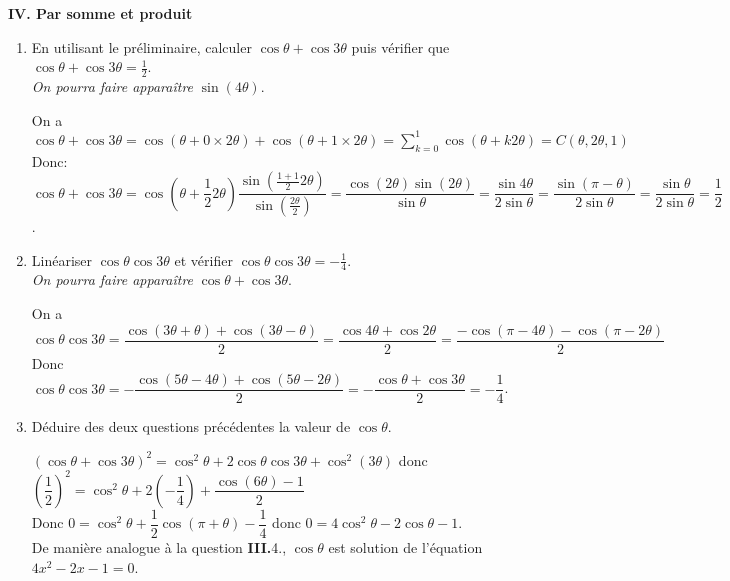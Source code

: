 \documentclass[a4paper,french,bookmarks]{article}
\begin{document}
\noindent\textbf{IV. Par somme et produit}
\begin{enumerate}
    \item En utilisant le préliminaire, calculer $\cos \theta + \cos 3\theta$ puis vérifier que $\cos \theta + \cos 3\theta = \frac{1}{2}$.\\
    \textit{On pourra faire apparaître} $\sin(4\theta)$.
        \begin{tcolorbox}[colback=black!8,colframe=black!9,boxrule=.25pt,enhanced,arc is angular,arc=0pt]
    On a $\displaystyle \cos \theta + \cos 3\theta = \cos(\theta + 0\times2\theta) + \cos(\theta + 1\times2\theta)
        = \sum_{k=0}^1 \cos(\theta + k2\theta) = C(\theta,2\theta,1)$ Donc:\\
        $\cos \theta + \cos 3\theta = \cos\left(\theta + \dfrac{1}{2}2\theta\right)\dfrac{\sin\left(\frac{1+1}{2}2\theta\right)}{\sin\left(\frac{2\theta}{2}\right)} = \dfrac{\cos(2\theta)\sin(2\theta)}{\sin \theta} = \dfrac{\sin 4\theta}{2\sin\theta} = \dfrac{\sin (\pi - \theta)}{2\sin \theta}=\dfrac{\sin\theta}{2\sin\theta}=\dfrac{1}{2}$.
    \end{tcolorbox}
    \item Linéariser $\cos \theta \cos 3\theta$ et vérifier $\cos \theta \cos 3\theta=-\frac{1}{4}$.\\
    \textit{On pourra faire apparaître} $\cos \theta + \cos 3\theta$.
         \begin{tcolorbox}[colback=black!8,colframe=black!9,boxrule=.25pt,enhanced,arc is angular,arc=0pt]
     On a $\displaystyle \cos\theta\cos3\theta = \dfrac{\cos(3\theta + \theta)+\cos(3\theta - \theta)}{2} = \dfrac{\cos 4\theta + \cos2\theta}{2} = \dfrac{-\cos(\pi-4\theta)-\cos(\pi-2\theta)}{2}$\\
     Donc $\cos\theta\cos3\theta = -\dfrac{\cos(5\theta - 4\theta) + \cos(5\theta - 2\theta)}{2} =-\dfrac{\cos\theta + \cos3\theta}{2} = -\dfrac{1}{4}$.
     \end{tcolorbox}
    \item Déduire des deux questions précédentes la valeur de $\cos \theta$.
    \begin{tcolorbox}[colback=black!8,colframe=black!9,boxrule=.25pt,enhanced,arc is angular,arc=0pt]
    $\left(\cos\theta + \cos3\theta\right)^2 = \cos^2\theta + 2\cos\theta\cos3\theta + \cos^2(3\theta)$ donc $\left(\dfrac{1}{2}\right)^2 = \cos^2\theta + 2\left(-\dfrac{1}{4}\right) + \dfrac{\cos(6\theta)-1}{2}$\\
    Donc $0 = \cos^2 \theta + \dfrac{1}{2}\cos(\pi + \theta) - \dfrac{1}{4}$ donc $0 = 4\cos^2 \theta - 2\cos\theta - 1$.\\
    De manière analogue à  la question \textbf{III.}4., $\cos \theta$ est solution de l'équation $4x^2-2x-1=0$.\\
    

\end{tcolorbox}
\end{enumerate}
\end{document}
